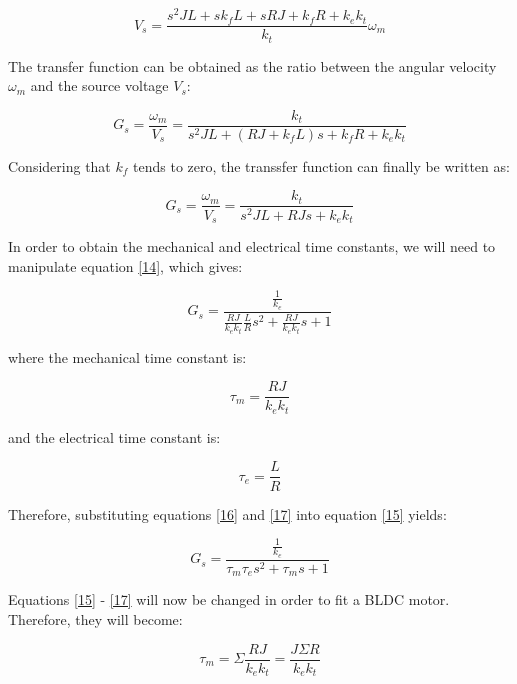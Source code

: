 \begin{equation}
\label{12}
	V_{s}=\frac{s^{2}JL+sk_{f}L+sRJ+k_{f}R+k_{e}k_{t}}{k_{t}}\omega_{m}
\end{equation} 

The transfer function can be obtained as the ratio between the angular velocity $\omega_{m}$ and the source voltage $V_{s}$:

\begin{equation}
\label{13}
	G_{s}=\frac{\omega_{m}}{V_{s}}=\frac{k_{t}}{s^{2}JL+(RJ+k_{f}L)s+k_{f}R+k_{e}k_{t}}
\end{equation} 

Considering that $k_{f}$ tends to zero, the transsfer function can finally be  written as:

\begin{equation}
\label{14}
	G_{s}=\frac{\omega_{m}}{V_{s}}=\frac{k_{t}}{s^{2}JL+RJs+k_{e}k_{t}}
\end{equation} 

In order to obtain the mechanical and electrical time constants, we will need to manipulate equation \ref{14}, which gives:

\begin{equation}
\label{15}
	G_{s}=\frac{\frac{1}{k_{e}}}{\frac{RJ}{k_{e}k_{t}}\frac{L}{R}s^{2}+\frac{RJ}{k_{e}k_{t}}s+1}
\end{equation}

where the mechanical time constant is:

\begin{equation}
\label{16}
	\tau_{m}=\frac{RJ}{k_{e}k_{t}}
\end{equation}

and the electrical time constant is:

\begin{equation}
\label{17}
	\tau_{e}=\frac{L}{R}
\end{equation}

Therefore, substituting equations \ref{16} and \ref{17} into equation \ref{15} yields:

\begin{equation}
\label{18}
	G_{s}=\frac{\frac{1}{k_{e}}}{\tau_{m}\tau_{e}s^{2}+\tau_{m}s+1}
\end{equation}

Equations \ref{15} - \ref{17} will now be changed in order to fit a BLDC motor. Therefore, they will become:

\begin{equation}
\label{19}
	\tau_{m}=\Sigma{\frac{RJ}{k_{e}k_{t}}}=\frac{J\Sigma{R}}{k_{e}k_{t}}
\end{equation}

